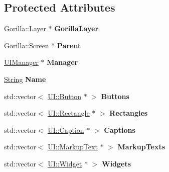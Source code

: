 \subsection*{Protected Attributes}
\begin{DoxyCompactItemize}
\item 
\hypertarget{classphys_1_1UILayer_ac1cfdc64e509e8bf94b10844655ebb6c}{
Gorilla::Layer $\ast$ {\bfseries GorillaLayer}}
\label{da/d48/classphys_1_1UILayer_ac1cfdc64e509e8bf94b10844655ebb6c}

\item 
\hypertarget{classphys_1_1UILayer_a3da8314d7bcab7a0261100969d636abf}{
Gorilla::Screen $\ast$ {\bfseries Parent}}
\label{da/d48/classphys_1_1UILayer_a3da8314d7bcab7a0261100969d636abf}

\item 
\hypertarget{classphys_1_1UILayer_aa6c5cb17111c680c1af20d734dd0a3d7}{
\hyperlink{classphys_1_1UIManager}{UIManager} $\ast$ {\bfseries Manager}}
\label{da/d48/classphys_1_1UILayer_aa6c5cb17111c680c1af20d734dd0a3d7}

\item 
\hypertarget{classphys_1_1UILayer_a26df3b08c7bdcb07eeb9f0633c8d2df8}{
\hyperlink{namespacephys_aa03900411993de7fbfec4789bc1d392e}{String} {\bfseries Name}}
\label{da/d48/classphys_1_1UILayer_a26df3b08c7bdcb07eeb9f0633c8d2df8}

\item 
\hypertarget{classphys_1_1UILayer_ae2a7d6dfb30eff9bec40b6a1a208dae3}{
std::vector$<$ \hyperlink{classphys_1_1UI_1_1Button}{UI::Button} $\ast$ $>$ {\bfseries Buttons}}
\label{da/d48/classphys_1_1UILayer_ae2a7d6dfb30eff9bec40b6a1a208dae3}

\item 
\hypertarget{classphys_1_1UILayer_a5b08f8ae240427c00bba64e544f6d8dd}{
std::vector$<$ \hyperlink{classphys_1_1UI_1_1Rectangle}{UI::Rectangle} $\ast$ $>$ {\bfseries Rectangles}}
\label{da/d48/classphys_1_1UILayer_a5b08f8ae240427c00bba64e544f6d8dd}

\item 
\hypertarget{classphys_1_1UILayer_aa895120d4197d7e255bb6db2eaaa84d7}{
std::vector$<$ \hyperlink{classphys_1_1UI_1_1Caption}{UI::Caption} $\ast$ $>$ {\bfseries Captions}}
\label{da/d48/classphys_1_1UILayer_aa895120d4197d7e255bb6db2eaaa84d7}

\item 
\hypertarget{classphys_1_1UILayer_a3b9913fb2f4142d3d52c899b4347b843}{
std::vector$<$ \hyperlink{classphys_1_1UI_1_1MarkupText}{UI::MarkupText} $\ast$ $>$ {\bfseries MarkupTexts}}
\label{da/d48/classphys_1_1UILayer_a3b9913fb2f4142d3d52c899b4347b843}

\item 
\hypertarget{classphys_1_1UILayer_a21707b7751f5184986eb3d73de2581b5}{
std::vector$<$ \hyperlink{classphys_1_1UI_1_1Widget}{UI::Widget} $\ast$ $>$ {\bfseries Widgets}}
\label{da/d48/classphys_1_1UILayer_a21707b7751f5184986eb3d73de2581b5}

\end{DoxyCompactItemize}


